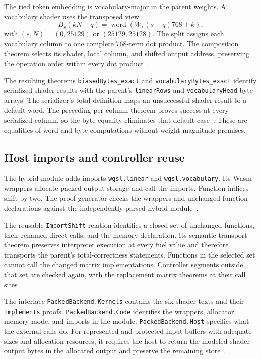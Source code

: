 \documentclass[11pt]{article}
\newcommand{\code}[1]{\texttt{#1}}
\begin{document}
The tied token embedding is vocabulary-major in the parent weights.  A vocabulary shader uses the transposed view
\[
B_s(kN+q)=\operatorname{word}(W,(s+q)768+k),
\]
with $(s,N)=(0,25129)$ or $(25129,25128)$.  The split assigns each vocabulary column to one complete 768-term dot product.  The composition theorem selects its shader, local column, and shifted output address, preserving the operation order within every dot product~\cite{packedsource}.

The resulting theorems \code{biasedBytes\_exact} and \code{vocabularyBytes\_exact} identify serialized shader results with the parent's \code{linearRows} and \code{vocabularyHead} byte arrays.  The serializer's total definition maps an unsuccessful shader result to a default word.  The preceding per-column theorem proves success at every serialized column, so the byte equality eliminates that default case~\cite{packedshader}.  These are equalities of word and byte computations without weight-magnitude premises.

\subsection{Host imports and controller reuse}

The hybrid module adds imports \code{wgsl.linear} and \code{wgsl.vocabulary}.  Its Wasm wrappers allocate packed output storage and call the imports.  Function indices shift by two.  The proof generator checks the wrappers and unchanged function declarations against the independently parsed hybrid module~\cite{build,backend}.

The reusable \code{ImportShift} relation identifies a closed set of unchanged functions, their renamed direct calls, and the memory declaration.  Its semantic transport theorem preserves interpreter execution at every fuel value and therefore transports the parent's total-correctness statements.  Functions in the selected set cannot call the changed matrix implementations.  Controller segments outside that set are checked again, with the replacement matrix theorems at their call sites~\cite{transport,composition}.

The interface \code{PackedBackend.Kernels} contains the six shader texts and their \code{Implements} proofs.  \code{PackedBackend.Code} identifies the wrappers, allocator, memory mode, and imports in the module.  \code{PackedBackend.Host} specifies what the external calls do.  For represented and protected input buffers with adequate sizes and allocation resources, it requires the host to return the modeled shader-output bytes in the allocated output and preserve the remaining store~\cite{backend}.
\end{document}
